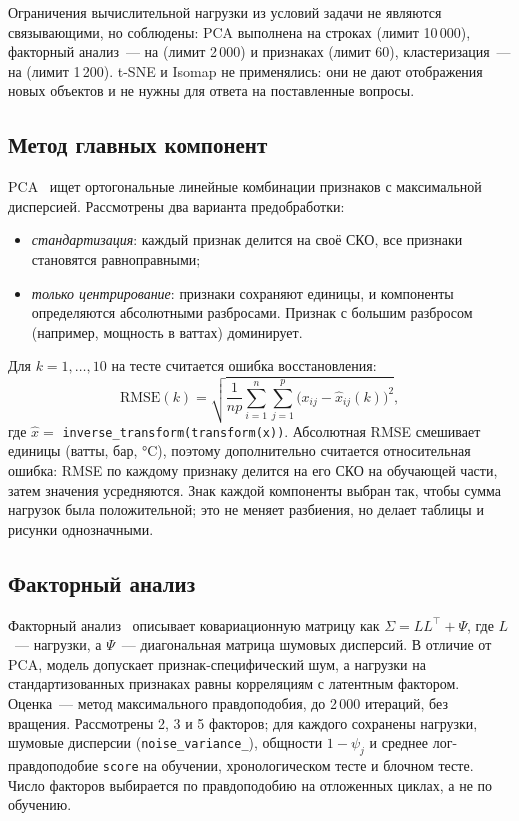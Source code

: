 \documentclass[14pt,a4paper]{extarticle}
\begin{document}
Ограничения вычислительной нагрузки из условий задачи не являются
связывающими, но соблюдены: PCA выполнена на \DataCycles{} строках
(лимит 10\,000), факторный анализ~--- на \DataTrain{} (лимит 2\,000) и
\DataFeaturesUsed{} признаках (лимит 60), кластеризация~--- на \ClustN{}
(лимит 1\,200). t-SNE и Isomap не применялись: они не дают отображения новых
объектов и не нужны для ответа на поставленные вопросы.

\subsection{Метод главных компонент}

PCA~\cite{jolliffe} ищет ортогональные линейные комбинации признаков с
максимальной дисперсией. Рассмотрены два варианта предобработки:
\begin{itemize}
\item \emph{стандартизация}: каждый признак делится на своё СКО, все признаки
  становятся равноправными;
\item \emph{только центрирование}: признаки сохраняют единицы, и компоненты
  определяются абсолютными разбросами. Признак с большим разбросом (например,
  мощность в ваттах) доминирует.
\end{itemize}

Для $k = 1,\dots,10$ на тесте считается ошибка восстановления:
\[
\mathrm{RMSE}(k) = \sqrt{\frac{1}{n p}\sum_{i=1}^{n}\sum_{j=1}^{p}
\bigl(x_{ij} - \hat x_{ij}(k)\bigr)^2},
\]
где $\hat x = $ \texttt{inverse\_transform(transform(x))}. Абсолютная RMSE
смешивает единицы (ватты, бар, °C), поэтому дополнительно считается
относительная ошибка: RMSE по каждому признаку делится на его СКО на
обучающей части, затем значения усредняются. Знак каждой компоненты выбран
так, чтобы сумма нагрузок была положительной; это не меняет разбиения, но
делает таблицы и рисунки однозначными.

\subsection{Факторный анализ}

Факторный анализ~\cite{harman} описывает ковариационную матрицу как
$\Sigma = LL^{\top} + \Psi$, где $L$~--- нагрузки, а $\Psi$~--- диагональная
матрица шумовых дисперсий. В отличие от PCA, модель допускает
признак-специфический шум, а нагрузки на стандартизованных признаках равны
корреляциям с латентным фактором. Оценка~--- метод максимального
правдоподобия, до 2\,000 итераций, без вращения. Рассмотрены 2, 3 и 5
факторов; для каждого сохранены нагрузки, шумовые дисперсии
(\texttt{noise\_variance\_}), общности $1-\psi_j$ и среднее
лог-правдоподобие \texttt{score} на обучении, хронологическом тесте и
блочном тесте. Число факторов выбирается по правдоподобию на отложенных
циклах, а не по обучению.
\end{document}
